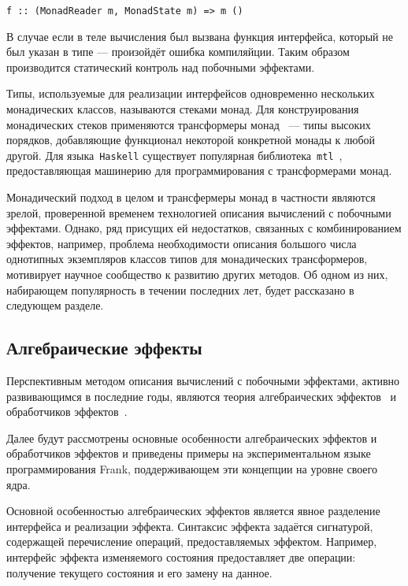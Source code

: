 \documentclass [a4paper] {article}
\begin{document}
\begin{verbatim}
f :: (MonadReader m, MonadState m) => m ()
\end{verbatim}   

В случае если в теле вычисления был вызвана функция интерфейса, 
который не был указан в типе --- произойдёт ошибка компиляйции. 
Таким образом производится статический контроль над побочными 
эффектами.

Типы, используемые для реализации интерфейсов одновременно нескольких
монадических классов, называются стеками монад. Для конструирования
монадических стеков применяются трансформеры монад~\cite{monadTransformers}
--- типы высоких порядков,
добавляющие функционал некоторой конкретной монады к любой другой. Для
языка~\texttt{Haskell} существует популярная библиотека~\texttt{mtl}~\cite{mtlHackage},
предоставляющая машинерию для программирования с трансформерами монад.

Монадический подход в целом и трансфермеры монад в частности являются зрелой,
проверенной временем технологией описания вычислений с побочными эффектами.
Однако, ряд присущих ей недостатков, связанных с комбинированием эффектов,
например, проблема необходимости описания большого числа однотипных
экземпляров классов типов для монадических трансформеров, мотивирует научное  
сообщество к развитию других методов. Об одном из них, набирающем популярность
в течении последних лет, будет рассказано в следующем разделе. 

\subsection{Алгебраические эффекты}

Перспективным методом описания вычислений с побочными эффектами, активно
развивающимся в последние годы, являются теория алгебраических
эффектов~\cite{AlgEffects} и обработчиков эффектов~\cite{EffectsHandlers}.

Далее будут рассмотрены основные особенности алгебраических эффектов и
обработчиков эффектов и приведены примеры на экспериментальном языке
программирования Frank, поддерживающем эти концепции на уровне своего ядра.

Основной особенностью алгебраических эффектов является явное разделение
интерфейса и реализации эффекта. Синтаксис эффекта задаётся сигнатурой,
содержащей перечисление операций, предоставляемых эффектом. Например, интерфейс 
эффекта изменяемого состояния предоставляет две операции: получение текущего
состояния и его замену на данное.
\end{document}
